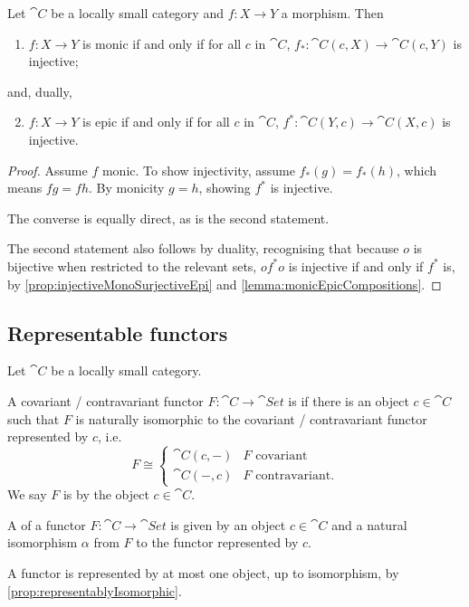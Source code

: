 \begin{proposition} \label{prop:monicEpicInPrePostComposition}
Let $\cat{C}$ be a locally small category and $f: X\to Y$ a morphism. Then
\begin{enumerate}
\item $f: X\to Y$ is monic \textup{if and only if} for all $c$ in $\cat{C}$, $f_*: \cat{C}(c,X) \to \cat{C}(c,Y)$ is injective;
\end{enumerate}
and, dually,
\begin{enumerate}
\setcounter{enumi}{1}
\item $f:X\to Y$ is epic \textup{if and only if} for all $c$ in $\cat{C}$, $f^*: \cat{C}(Y,c) \to \cat{C}(X,c)$ is injective.
\end{enumerate}
\end{proposition}
\begin{proof}
Assume $f$ monic. To show injectivity, assume $f_*(g) = f_*(h)$, which means $fg = fh$. By monicity $g = h$, showing $f^*$ is injective.

The converse is equally direct, as is the second statement.

The second statement also follows by duality, recognising that because $o$ is bijective when restricted to the relevant sets, $of^*o$ is injective if and only if $f^*$ is, by \ref{prop:injectiveMonoSurjectiveEpi} and \ref{lemma:monicEpicCompositions}.
\end{proof}

\subsection{Representable functors}
\begin{definition}
Let $\cat{C}$ be a locally small category.

A covariant / contravariant functor $F: \cat{C} \to \cat{Set}$ is  if there is an object $c\in\cat{C}$ such that $F$ is naturally isomorphic to the covariant / contravariant functor represented by $c$, i.e.
\[ F \cong \begin{cases}
\cat{C}(c,-) & \text{$F$ covariant} \\
\cat{C}(-,c) & \text{$F$ contravariant.}
\end{cases} \]
We say $F$ is  by the object $c\in\cat{C}$.

A  of a functor $F: \cat{C} \to \cat{Set}$ is given by an object $c\in\cat{C}$ and a natural isomorphism $\alpha$ from $F$ to the functor represented by $c$.
\end{definition}
A functor is represented by at most one object, up to isomorphism, by \ref{prop:representablyIsomorphic}.

